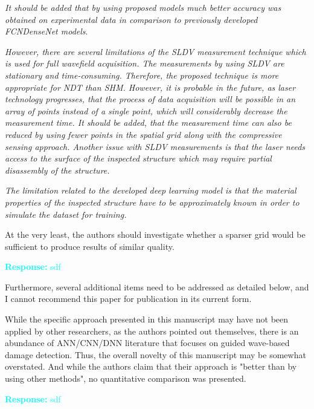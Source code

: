 \documentclass[11pt,a2paper]{report}
\begin{document}
   \emph{It should be added that by using proposed models much better accuracy was
obtained on experimental data in comparison to previously developed FCNDenseNet
models}.
   
   \emph{However, there are several limitations of the SLDV measurement technique which is used for full wavefield acquisition.
   The measurements by using SLDV are stationary and time-consuming.
   Therefore, the proposed technique is more appropriate for NDT than SHM.
   However, it is probable in the future, as
laser technology progresses, that the process of data acquisition will be possible in
an array of points instead of a single point, which will considerably decrease the measurement time.
   It should be added, that the measurement time can also be reduced by using fewer points in the spatial grid along with the compressive sensing approach.
   Another issue with SLDV measurements is that the laser needs access to the surface of the inspected structure which may require partial disassembly of the structure.
   }

	\emph{The limitation related to the developed deep learning model is that the material properties of the inspected structure have to be approximately known in order to simulate the dataset for training.}
   
	At the very least, the authors should investigate whether a sparser grid would be sufficient to produce results of similar quality. 
	
	\textcolor{Cyan}{
		\textbf{Response:}	
		sdf
	}


	Furthermore, several additional items need to be addressed as detailed below, and I cannot recommend this paper for publication in its current form.
	
	While the specific approach presented in this manuscript may have not been applied by other researchers, as the authors pointed out themselves, there is an abundance of ANN/CNN/DNN literature that focuses on guided wave-based damage detection. 
	Thus, the overall novelty of this manuscript may be somewhat overstated. And while the authors claim that their approach is "better than by using other methods", no quantitative comparison was presented. 

	\textcolor{Cyan}{
		\textbf{Response:}
		sdf
	}
\end{document}
